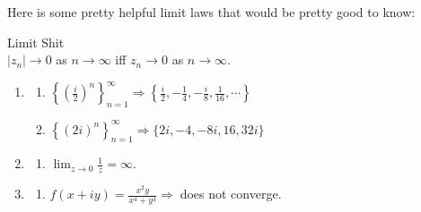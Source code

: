 \documentclass[10pt]{paper}
\newcommand{\gspc}{\vspace{0.13cm}} %
\newcommand{\gline}[0]{\gspc\\} %
\newcommand{\cpr}[1]{\left(#1\right)}
\begin{document}
Here is some pretty helpful limit laws that would be pretty good to know:
\begin{theorem}{Limit Shit}{}\gline{}
  $|z_n|\to 0$ as $n\to\infty$ iff $z_n\to 0$ as $n\to\infty$.
  \begin{enumerate}
    \item \begin{enumerate}
      \item [(a)]$\displaystyle\left\{\cpr{\frac{i}2}^n\right\}_{n=1}^\infty \Rightarrow \left\{\frac{i}2, -\frac{1}{4}, -\frac{i}8, \frac{1}{16},\cdots\right\}$
      \item [(b)]$\displaystyle\left\{(2i)^n\right\}_{n=1}^\infty \Rightarrow \{2i, -4, -8i, 16, 32i\}$
    \end{enumerate}
    \item \begin{enumerate}
      \item [(c)] $\displaystyle \lim_{z\to 0}\frac{1}z = \infty$.
    \end{enumerate}
    \item \begin{enumerate}
      \item [(d)] $f(x+iy) = \frac{x^2y}{x^4 + y^4} \Rightarrow\;$does not converge. 
    \end{enumerate}
  \end{enumerate}
\end{theorem}
\end{document}
